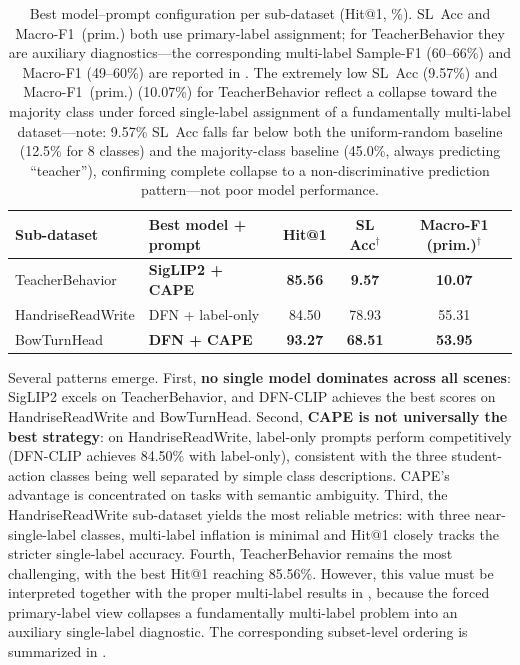 \documentclass[symmetry,article,submit,pdftex,moreauthors]{Definitions/mdpi}
\begin{document}
\begin{table}[H]
\caption{Best model--prompt configuration per sub-dataset (Hit@1, \%). SL~Acc and Macro-F1~(prim.) both use primary-label assignment; for TeacherBehavior they are auxiliary diagnostics---the corresponding multi-label Sample-F1 (60--66\%) and Macro-F1 (49--60\%) are reported in . The extremely low SL~Acc (9.57\%) and Macro-F1~(prim.) (10.07\%) for TeacherBehavior reflect a collapse toward the majority class under forced single-label assignment of a fundamentally multi-label dataset---note: 9.57\% SL~Acc falls far below both the uniform-random baseline (12.5\% for 8 classes) and the majority-class baseline (45.0\%, always predicting ``teacher''), confirming complete collapse to a non-discriminative prediction pattern---not poor model performance.}
\label{tab:best_per_dataset}
\centering
\small
\begin{tabular}{llccc}
\toprule
\textbf{Sub-dataset} & \textbf{Best model + prompt} & \textbf{Hit@1} & \textbf{SL Acc$^{\dagger}$} & \textbf{Macro-F1 (prim.)$^{\dagger}$} \\
\midrule
TeacherBehavior & \textbf{SigLIP2 + CAPE} & \textbf{85.56} & \textbf{9.57} & \textbf{10.07} \\
HandriseReadWrite & DFN + label-only & 84.50 & 78.93 & 55.31 \\
BowTurnHead & \textbf{DFN + CAPE} & \textbf{93.27} & \textbf{68.51} & \textbf{53.95} \\
\bottomrule
\end{tabular}
\end{table}

Several patterns emerge.
First, \textbf{no single model dominates across all scenes}: SigLIP2 excels on TeacherBehavior, and DFN-CLIP achieves the best scores on HandriseReadWrite and BowTurnHead.
Second, \textbf{CAPE is not universally the best strategy}: on HandriseReadWrite, label-only prompts perform competitively (DFN-CLIP achieves 84.50\% with label-only), consistent with the three student-action classes being well separated by simple class descriptions. CAPE's advantage is concentrated on tasks with semantic ambiguity.
Third, the HandriseReadWrite sub-dataset yields the most reliable metrics: with three near-single-label classes, multi-label inflation is minimal and Hit@1 closely tracks the stricter single-label accuracy.
Fourth, TeacherBehavior remains the most challenging, with the best Hit@1 reaching 85.56\%. However, this value must be interpreted together with the proper multi-label results in , because the forced primary-label view collapses a fundamentally multi-label problem into an auxiliary single-label diagnostic.
The corresponding subset-level ordering is summarized in .
\end{document}
